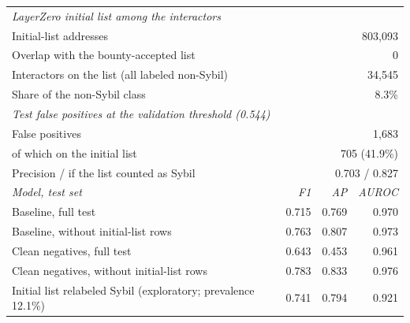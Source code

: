 \begin{tabular}{lrrr}
\toprule
\multicolumn{4}{l}{\emph{LayerZero initial list among the interactors}} \\
Initial-list addresses & \multicolumn{3}{r}{803,093} \\
Overlap with the bounty-accepted list & \multicolumn{3}{r}{0} \\
Interactors on the list (all labeled non-Sybil) & \multicolumn{3}{r}{34,545} \\
Share of the non-Sybil class & \multicolumn{3}{r}{8.3\%} \\
\midrule
\multicolumn{4}{l}{\emph{Test false positives at the validation threshold (0.544)}} \\
False positives & \multicolumn{3}{r}{1,683} \\
\quad of which on the initial list & \multicolumn{3}{r}{705 (41.9\%)} \\
Precision / if the list counted as Sybil & \multicolumn{3}{r}{0.703 / 0.827} \\
\midrule
\emph{Model, test set} & \emph{F1} & \emph{AP} & \emph{AUROC} \\
Baseline, full test & 0.715 & 0.769 & 0.970 \\
Baseline, without initial-list rows & 0.763 & 0.807 & 0.973 \\
Clean negatives, full test & 0.643 & 0.453 & 0.961 \\
Clean negatives, without initial-list rows & 0.783 & 0.833 & 0.976 \\
\midrule
Initial list relabeled Sybil (exploratory; prevalence 12.1\%) & 0.741 & 0.794 & 0.921 \\
\bottomrule
\end{tabular}
